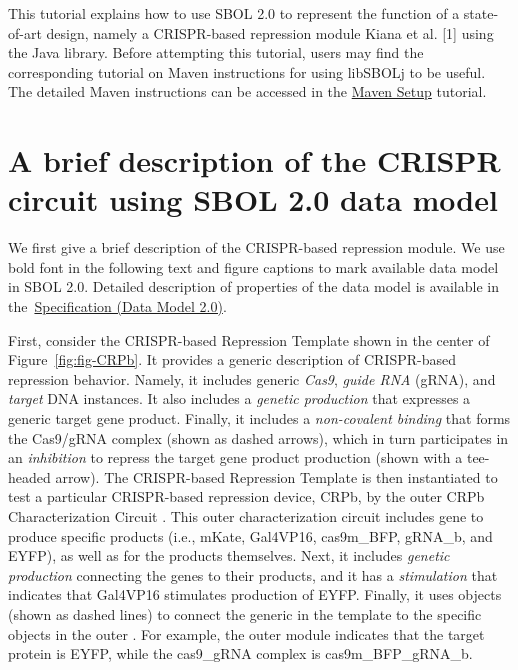 This tutorial explains how to use SBOL 2.0 to represent the function of a state-of-art design, namely a CRISPR-based repression module Kiana et al. [1] using the Java library. Before attempting this tutorial, users may find the corresponding tutorial on Maven instructions for using libSBOLj to be useful. The detailed Maven instructions can be accessed in the  \href{http://sbolstandard.org/wp-content/uploads/2016/09/GettingStartedTutorial_libSBOLj.pdf}{Maven Setup} tutorial. 

\section*{A brief description of the CRISPR circuit using SBOL 2.0 data model}
We first give a brief description of the CRISPR-based repression module. We use bold font in the following text and figure captions to mark available data model in SBOL 2.0. Detailed description of properties of the data model is available in the~\href{http://sbolstandard.org/downloads/specification-data-model-2-0/}{Specification
  (Data Model 2.0)}.

First, consider the CRISPR-based Repression Template  shown in the center of Figure~\ref{fig:fig-CRPb}. It provides a generic description of CRISPR-based repression behavior. Namely, it includes generic \emph{Cas9}, \emph{guide RNA} (gRNA), and \emph{target} DNA  instances. It also includes a \emph{genetic production}  that expresses a generic target gene product.  Finally, it includes a \emph{non-covalent binding}  that forms the Cas9/gRNA complex (shown as dashed arrows), which in turn participates in an \emph{inhibition}  to repress the target gene product production (shown with a tee-headed arrow). The CRISPR-based Repression Template is then instantiated to test a particular CRISPR-based repression device, CRPb, by the outer CRPb Characterization Circuit .  This outer characterization circuit includes gene  to produce specific products (i.e., mKate, Gal4VP16, cas9m\_BFP, gRNA\_b, and EYFP), as well as  for the products themselves.  Next, it includes \emph{genetic production}  connecting the genes to their products, and it has a \emph{stimulation}  that indicates that Gal4VP16 stimulates production of EYFP.  Finally, it uses  objects (shown as dashed lines) to connect the generic  in the template to the specific objects in the outer .  For example, the outer module indicates that the target protein is EYFP, while the cas9\_gRNA complex is cas9m\_BFP\_gRNA\_b.

